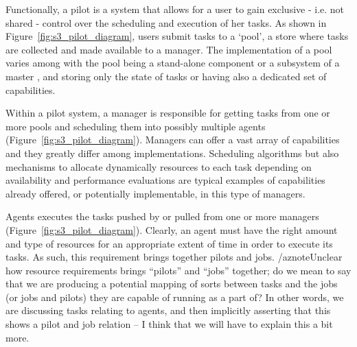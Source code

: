 \documentclass{sig-alternate}
\begin{document}
Functionally, a pilot is a system that allows for a user to gain exclusive - i.e. not shared - control over the scheduling and execution of her tasks. As shown in Figure~\ref{fig:s3_pilot_diagram}, users submit tasks to a `pool', a store where tasks are collected and made available to a manager. 
The implementation of a pool varies among \pilotjobs{} with the pool being a stand-alone component or a subsystem of a master
, and storing only the state of tasks or having also a dedicated set of capabilities.


Within a pilot system, a manager is responsible for getting tasks from
one or more pools and scheduling them into possibly multiple agents
(Figure~\ref{fig:s3_pilot_diagram}). Managers can offer a vast array
of capabilities and they greatly differ among \pilotjob
implementations. Scheduling algorithms but also mechanisms to allocate
dynamically resources to each task depending on availability and
performance evaluations are typical examples of capabilities already
offered, or potentially implementable, in this type of managers.


Agents executes the tasks pushed by or pulled from one or more managers (Figure~\ref{fig:s3_pilot_diagram}). Clearly, an agent must have the right amount and type of resources for an appropriate extent of time in order to execute its tasks. As such, this requirement brings together pilots and jobs.
/aznote{Unclear how resource requirements brings ``pilots'' and ``jobs'' together; do we mean to say that we are producing
a potential mapping of sorts between tasks and the jobs (or jobs and pilots) they are capable of running as a part of?  In
other words, we are discussing tasks relating to agents, and then implicitly asserting that this shows a pilot and job relation
-- I think that we will have to explain this a bit more.}
\end{document}
